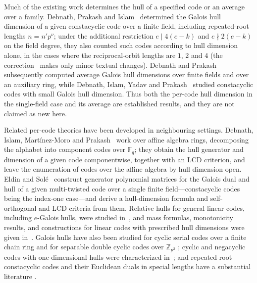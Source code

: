 \documentclass[10pt,journal,draftclsnofoot,onecolumn]{IEEEtran}
\theoremstyle{definition}
\theoremstyle{remark}
\newcommand{\Fq}{\mathbb{F}_q}
\begin{document}
Much of the existing work determines the hull of a specified code or
an average over a family. Debnath, Prakash and Islam~\cite{DPI2023}
determined the Galois hull dimension of a given constacyclic code over
a finite field, including repeated-root lengths \(n = n' p^{\nu}\);
under the additional restriction \(e \mid 4(e-k)\) and
\(e \nmid 2(e-k)\) on the field degree, they also counted such codes
according to hull dimension alone, in the cases where the
reciprocal-orbit lengths are \(1\), \(2\) and \(4\) (the
correction~\cite{DPI2023corr} makes only minor textual changes).
Debnath and Prakash~\cite{DP2025} subsequently computed average
Galois hull dimensions over finite fields and over an auxiliary ring,
while Debnath, Islam, Yadav and Prakash~\cite{DIYP2026} studied
constacyclic codes with small Galois hull dimension. Thus both the
per-code hull dimension in the single-field case and its average are
established results, and they are not claimed as new here.

Related per-code theories have been developed in neighbouring
settings. Debnath, Islam, Mart\'inez-Moro and
Prakash~\cite{DIMP2026} work over affine algebra rings, decomposing
the alphabet into component codes over \(\Fq\); they obtain the hull
generator and dimension of a given code componentwise, together with
an LCD criterion, and leave the enumeration of codes over the
affine algebra by hull dimension open. Eldin and
Sol\'e~\cite{ES2026} construct generator polynomial matrices for the
Galois dual and hull of a given multi-twisted code over a single
finite field---constacyclic codes being the index-one case---and
derive a hull-dimension formula and self-orthogonal and LCD criteria
from them. Relative hulls for general linear codes, including
\(e\)-Galois hulls, were studied in~\cite{ACLMRS2024}, and mass
formulas, monotonicity results, and constructions for linear codes
with prescribed hull dimensions were given
in~\cite{LS2024, LSL2025, BBO2026, LYW2025}. Galois hulls have also
been studied for cyclic serial codes over a finite chain ring
\cite{Talbi2021} and for separable double cyclic codes over
\(\mathbb{Z}_{p^2}\) \cite{DPDC2025}; cyclic and negacyclic codes with
one-dimensional hulls were characterized in~\cite{DS2024}; and
repeated-root constacyclic codes and their Euclidean duals in special
lengths have a substantial literature
\cite{CDL2015, Sharma2015, WZLL2023, ZWLL2025}.
\end{document}
